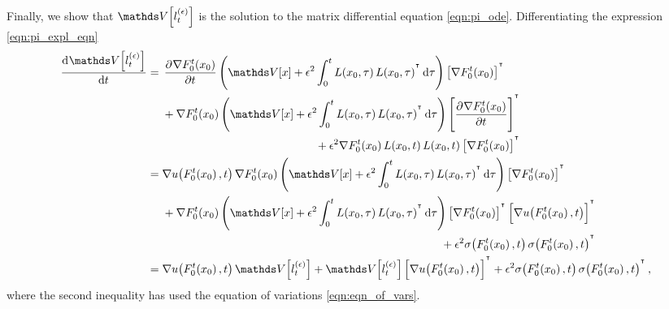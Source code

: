 Finally, we show that \(\var{l_t^{(\epsilon)}}\) is the solution to the matrix differential equation \eqref{eqn:pi_ode}.
Differentiating the expression \eqref{eqn:pi_expl_eqn} %
\begin{align*}
	\dod{\var{l_t^{(\epsilon)}}}{t} & = \begin{multlined}[t]
		                                    \dpd{\nabla F_0^t\!\left(x_0\right)}{t}\left(\var{x} + \epsilon^2 \int_0^t{L\!\left(x_0, \tau\right)L\!\left(x_0, \tau\right)^{\T}\dif\tau} \right)\left[\nabla F_0^t\!\left(x_0\right)\right]^{\T} \\
		                                    + \nabla F_0^t\!\left(x_0\right)\left(\var{x} + \epsilon^2 \int_0^t{L\!\left(x_0, \tau\right)L\!\left(x_0, \tau\right)^{\T}\dif\tau} \right)\left[\dpd{\nabla F_0^t\!\left(x_0\right)}{t}\right]^{\T} \\
		                                    + \epsilon^2\nabla F_0^t\!\left(x_0\right)L\!\left(x_0, t\right) L\!\left(x_0, t\right)\left[\nabla F_0^t\!\left(x_0\right)\right]^{\T}
	                                    \end{multlined}                                                                      \\
	                                & = \begin{multlined}[t]
		                                    \nabla u\!\left(F_0^t\!\left(x_0\right), t\right)\nabla F_0^t\!\left(x_0\right)\left(\var{x} + \epsilon^2 \int_0^t{L\!\left(x_0, \tau\right)L\!\left(x_0, \tau\right)^{\T}\dif\tau} \right)\left[\nabla F_0^t\!\left(x_0\right)\right]^{\T} \\
		                                    + \nabla F_0^t\!\left(x_0\right)\left(\var{x} + \epsilon^2 \int_0^t{L\!\left(x_0, \tau\right)L\!\left(x_0, \tau\right)^{\T}\dif\tau} \right)\left[\nabla F_0^t\!\left(x_0\right)\right]^{\T}\left[\nabla u\!\left(F_0^t\!\left(x_0\right), t\right)\right]^{\T} \\
		                                    + \epsilon^2\sigma\!\left(F_0^t\!\left(x_0\right), t\right)\sigma\!\left(F_0^t\!\left(x_0\right), t\right)^{\T}
	                                    \end{multlined}          \\
	                                & = \nabla u\!\left(F_0^t\!\left(x_0\right), t\right) \var{l_t^{(\epsilon)}} + \var{l_t^{(\epsilon)}}\left[\nabla u\!\left(F_0^t\!\left(x_0\right), t\right)\right]^{\T} + \epsilon^2\sigma\!\left(F_0^t\!\left(x_0\right), t\right)\sigma\!\left(F_0^t\!\left(x_0\right), t\right)^{\T},
\end{align*}
where the second inequality has used the equation of variations \eqref{eqn:eqn_of_vars}.


